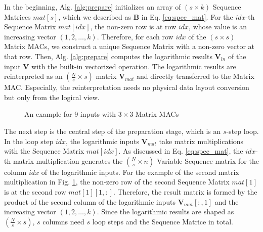 \documentclass[12pt]{extbook}
\begin{document}
In the beginning, Alg. \ref{alg:prepare} initializes an array of $(s \times k)$ Sequence Matrices $mat[s]$, which we described as $\textbf{B}$ in Eq. \ref{eq:spec_mat}. For the $idx$-th Sequence Matrix $mat[idx]$, the non-zero row is at row $idx$, whose value is an increasing vector $(1, 2, \dots, k)$. Therefore, for each row $idx$ of the $(s \times s)$ Matrix MACs, we construct a unique Sequence Matrix with a non-zero vector at that row. Then, Alg. \ref{alg:prepare} computes the logarithmic results $\textbf{V}_{ln}$ of the input $\textbf{V}$ with the built-in vectorized operation. The logarithmic results are reinterpreted as an $(\frac{N}{s} \times s)$ matrix $\textbf{V}_{mat}$ and directly transferred to the Matrix MAC. Especially, the reinterpretation needs no physical data layout conversion but only from the logical view. 

\begin{figure}[t]
    \caption{An example for 9 inputs with $3 \times 3$ Matrix MACs}
    \label{fig:trans_ln}
    \end{figure}

The next step is the central step of the preparation stage, which is an $s$-step loop. In the loop step $idx$, the logarithmic inputs $\textbf{V}_{mat}$ take matrix multiplications with the Sequence Matrix $mat[idx]$. As discussed in Eq. \ref{eq:spec_mat}, the $idx$-th matrix multiplication generates the $(\frac{N}{s} \times n)$ Variable Sequence matrix for the column $idx$ of the logarithmic inputs. For the example of the second matrix multiplication in Fig. \ref{fig:trans_ln}, the non-zero row of the second Sequence Matrix $mat[1]$ is at the second row $mat[1][1, :]$. Therefore, the result matrix is formed by the product of the second column of the logarithmic inputs $\textbf{V}_{mat}[:, 1]$ and the increasing vector $(1, 2, \dots, k)$. Since the logarithmic results are shaped as $(\frac{N}{s} \times s)$, $s$ columns need $s$ loop steps and the Sequence Matrice in total.
\end{document}
